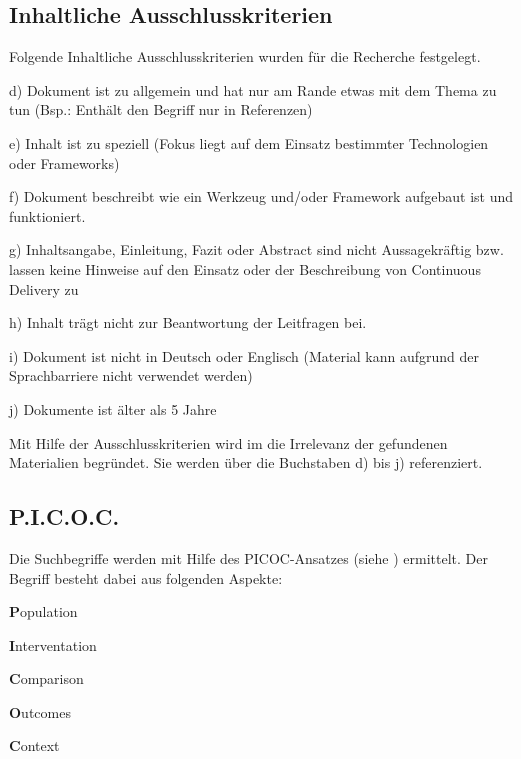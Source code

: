 \subsection{Inhaltliche Ausschlusskriterien}
\label{subsec:inhaltlicheAusschlusskriterien}
Folgende Inhaltliche Ausschlusskriterien wurden für die Recherche festgelegt.
\begin{list}{label}{spacing}
	\item[d)] Dokument ist zu allgemein und hat nur am Rande etwas mit dem Thema zu tun (Bsp.: Enthält den Begriff nur in Referenzen)
	\item[e)] Inhalt ist zu speziell (Fokus liegt auf dem Einsatz bestimmter Technologien oder Frameworks)
	\item[f)] Dokument beschreibt wie ein Werkzeug und/oder Framework aufgebaut ist und funktioniert.
	\item[g)] Inhaltsangabe, Einleitung, Fazit oder Abstract sind nicht Aussagekräftig bzw. lassen keine Hinweise auf den Einsatz oder der Beschreibung von Continuous Delivery zu
	\item[h)] Inhalt trägt nicht zur Beantwortung der Leitfragen bei.
	\item[i)] Dokument ist nicht in Deutsch oder Englisch (Material kann aufgrund der Sprachbarriere nicht verwendet werden)
	\item[j)] Dokumente ist älter als 5 Jahre
\end{list}
Mit Hilfe der Ausschlusskriterien wird im  die Irrelevanz der gefundenen Materialien begründet. Sie werden über die Buchstaben d) bis j) referenziert.

\subsection{P.I.C.O.C.}
\label{subsec:picoc}
Die Suchbegriffe werden mit Hilfe des PICOC-Ansatzes (siehe \cite{Kitchenham2007}) ermittelt. Der Begriff besteht dabei aus folgenden Aspekte:
\begin{list}{}{spacing}
	\item \textbf{P}opulation
	\item \textbf{I}nterventation
	\item \textbf{C}omparison
	\item \textbf{O}utcomes
	\item \textbf{C}ontext
\end{list}

